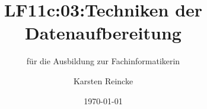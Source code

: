 \documentclass[]{beamer}
\title{LF11c:03:Techniken der Datenaufbereitung}
\subtitle{für die Ausbildung zur Fachinformatikerin}
\institute[GS-LDK]{Gewerbliche Schulen Dillenburg}
\author{Karsten Reincke}
\date{\today}
\def\cfgGl{../../../cfg.gl/}
\begin{document}

\begin{frame}
  \titlepage

  
\end{frame}






\logo{}
\newpage



%
\end{document}
